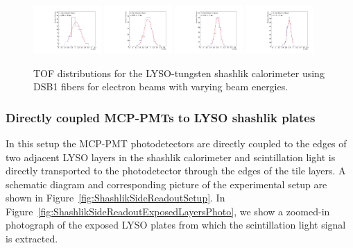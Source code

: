\begin{figure}[h] \centering
\includegraphics[width=0.23\textwidth]{figs/TOF_ShashlikDSB1Fiber_Electron_4GeV} 
\includegraphics[width=0.23\textwidth]{figs/TOF_ShashlikDSB1Fiber_Electron_8GeV} 
\includegraphics[width=0.23\textwidth]{figs/TOF_ShashlikDSB1Fiber_Electron_16GeV} 
\includegraphics[width=0.23\textwidth]{figs/TOF_ShashlikDSB1Fiber_Electron_32GeV} 
\caption{\small TOF distributions for the LYSO-tungsten shashlik calorimeter
using DSB1 fibers for electron beams with varying beam energies.} 
\label{fig:ShashlikFiberTOF}
\end{figure}

\subsubsection{Directly coupled MCP-PMTs to LYSO shashlik plates}
In this setup the MCP-PMT photodetectors are directly coupled to the edges of two adjacent LYSO layers in the shashlik
calorimeter and scintillation light is directly transported to the photodetector
through the edges of the tile layers. A schematic diagram and corresponding
picture  of the experimental setup are shown in
Figure~\ref{fig:ShashlikSideReadoutSetup}. In
Figure~\ref{fig:ShashlikSideReadoutExposedLayersPhoto}, we show a zoomed-in
photograph of the exposed LYSO plates from which the scintillation light signal
is extracted.

